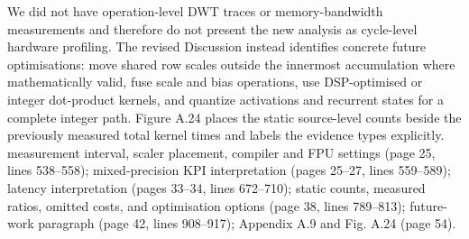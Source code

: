 {}We did not have operation-level DWT traces or memory-bandwidth measurements and therefore do not present the new analysis as cycle-level hardware profiling. The revised Discussion instead identifies concrete future optimisations: move shared row scales outside the innermost accumulation where mathematically valid, fuse scale and bias operations, use DSP-optimised or integer dot-product kernels, and quantize activations and recurrent states for a complete integer path. Figure A.24 places the static source-level counts beside the previously measured total kernel times and labels the evidence types explicitly.\markdownRendererParagraphSeparator
{} measurement interval, scaler placement, compiler and FPU settings (page 25, lines 538--558); mixed-precision KPI interpretation (pages 25--27, lines 559--589); latency interpretation (pages 33--34, lines 672--710); static counts, measured ratios, omitted costs, and optimisation options (page 38, lines 789--813); future-work paragraph (page 42, lines 908--917); Appendix A.9 and Fig. A.24 (page 54).
\markdownRendererSectionEnd 
\markdownRendererSectionEnd \markdownRendererDocumentEnd